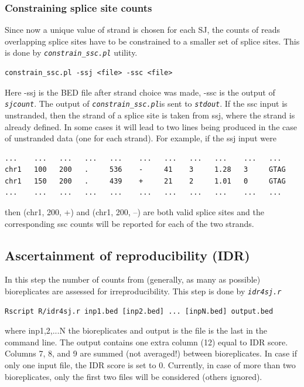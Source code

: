 \documentclass{article}
\newcommand{\prog}[1]{{\tt\em #1}}
\begin{document}
\subsubsection{Constraining splice site counts}
Since now a unique value of strand is chosen for each SJ, the counts of reads overlapping splice sites have to be constrained to a smaller set of splice sites.
This is done by \prog{constrain\_ssc.pl} utility.
\begin{verbatim}
constrain_ssc.pl -ssj <file> -ssc <file> 
\end{verbatim}
Here -ssj is the BED file after strand choice was made, -ssc is the output of \prog{sjcount}. The output of \prog{constrain\_ssc.pl}is sent to \prog{stdout}. 
If the ssc input is unstranded, then the strand of a splice site is taken from ssj, where the strand is already defined. In some cases it will lead to two 
lines being produced in the case of unstranded data (one for each strand). For example, if the ssj input were
\begin{verbatim}
...    ...   ...   ...   ...    ...   ...   ...   ...    ...   ...
chr1   100   200   .     536    -     41    3     1.28   3     GTAG
chr1   150   200   .     439    +     21    2     1.01   0     GTAG
...    ...   ...   ...   ...    ...   ...   ...   ...    ...   ...
\end{verbatim}
then (chr1, 200, +) and (chr1, 200, --) are both valid splice sites and the corresponding ssc counts will be reported for each of the two strands.

\subsection{Ascertainment of reproducibility (IDR)}
In this step the number of counts from (generally, as many as possible) bioreplicates are assessed for irreproducibility. This step is done by \prog{idr4sj.r}
\begin{verbatim}
Rscript R/idr4sj.r inp1.bed [inp2.bed] ... [inpN.bed] output.bed
\end{verbatim}
where inp1,2,...N the bioreplicates and output is the file is the last in the command line. The output contains one extra column (12) equal to IDR score.
Columns 7, 8, and 9 are summed (not averaged!) between bioreplicates. 
In case if only one input file, the IDR score is set to 0. Currently, in case of more than two bioreplicates, only the first two files will be considered (others ignored).

\end{document}
